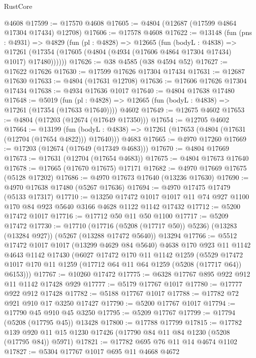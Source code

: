 \begin{lexlean}{RustCore}
\begin{coremodule}
    @4608
@17599 := @17570 @4608
@17605 := @4804 (@12687 (@17599 @4864 @17304 @17434) @12708)
@17606 := @17578 @4608
@17622 := @13148
    (fun (pns : @4931) =>
    @4829
      (fun (pl : @4828) =>
      @12665
        (fun (bodyL : @4838) =>
        @17261 (@17354 (@17605 (@4804 (@4934 (@17606 @4864 @17304 @17434) @1017) @17480))))))
@17626 := @38 @4585 (@38 @4594 @52)
@17627 := @17622 @17626
@17630 := @17599 @17626 @17304 @17434
@17631 := @12687 @17630
@17633 := @4804 (@17631 @12708)
@17636 := @17606 @17626 @17304 @17434
@17638 := @4934 @17636 @1017
@17640 := @4804 @17638 @17480
@17648 := @5019
    (fun (pl : @4828) => @12665 (fun (bodyL : @4838) => @17261 (@17354 (@17633 @17640))))
    @4602
@17649 := @12675 @4602
@17653 := @4804 (@17203 (@12674 (@17649 @17350)))
@17654 := @12705 @4602
@17664 := @13199
    (fun (bodyL : @4838) => @17261 (@17653 (@4804 (@17631 (@12704 (@17654 @4822))) @17640)))
    @4683
@17665 := @4970 @17260
@17669 := @17203 (@12674 (@17649 (@17349 @4683)))
@17670 := @4804 @17669
@17673 := @17631 (@12704 (@17654 @4683))
@17675 := @4804 @17673 @17640
@17678 := @17665 (@17670 @17675) @17171
@17682 := @4970 @17669 @17675 (@5128 @17202)
@17686 := @4970 @17673 @17640 (@13236 @17630)
@17690 := @4970 @17638 @17480 (@5267 @17636)
@17694 := @4970 @17475 @17479 (@5133 @17317)
@17710 := @13250
    @17472
    @1017
    @1017
    @11
    @74
    @927
    @1100
    @170
    @84
    @923
    @5640
    @3166
    @4628
    @1122
    @1142
    @17432
@17712 := @5200 @17472 @1017
@17716 := @17712 @50 @11 @50 @1100
@17717 := @5209 @17472
@17730 := @17710
    (@17716 (@5208 (@17717 @50)) @5236)
    (@13283 (@13284 @927))
    (@5267 (@13288 @17472 @5640))
    @13294
@17766 := @5512
    @17472
    @1017
    @1017
    (@13299 @4629 @84 @5640)
    @4638
    @170
    @923
    @11
    @1142
    @4643
    @1142
    @17430
    (@6027
      @17472
      @170
      @11
      @1142
      @1259
      (@5529 @17472 @1017 @170 @11 @1259 (@17712 @64 @11 @64 @1259 (@5208 (@17717 @64)) @6153)))
@17767 := @10260 @17472
@17775 := @6328 @17767 @895 @922 @912 @11 @1142 @17428 @929
@17777 := @5179 @17767 @1017
@17780 := @17777 @922 @912 @17428
@17782 := @5188 @17767 @1017
@17788 := @17782 @72 @921 @910 @17 @3250 @17427
@17790 := @5200 @17767 @1017
@17794 := @17790 @45 @910 @45 @3250
@17795 := @5209 @17767
@17799 := @17794 (@5208 (@17795 @45)) @13428
@17800 := @17788 @17799
@17815 := @17782
    @139
    @920
    @11
    @15
    @1230
    @17426
    (@17790 @84 @11 @84 @1230 (@5208 (@17795 @84)) @5971)
@17821 := @17782 @695 @76 @11 @14 @4674 @1102
@17827 := @5304 @17767 @1017 @695 @11 @4668 @4672

\end{coremodule}
\end{lexlean}
